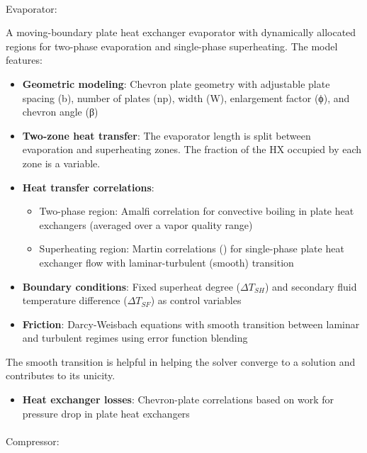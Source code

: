 \documentclass[journal=iecr,manuscript=]{achemso}
\makeatletter
\let\oldparagraph\paragraph
\renewcommand{\paragraph}{
    \@ifstar
      \xxxParagraphStar
      \xxxParagraphNoStar
  }
\newcommand{\xxxParagraphStar}[1]{\oldparagraph*{#1}\mbox{}}
\newcommand{\xxxParagraphNoStar}[1]{\oldparagraph{#1}\mbox{}}
\providecommand{\tightlist}{%
  \setlength{\itemsep}{0pt}\setlength{\parskip}{0pt}}
\makeatother
\begin{document}
\paragraph{Evaporator:}\label{evaporator}

A moving-boundary plate heat exchanger evaporator with dynamically
allocated regions for two-phase evaporation and single-phase
superheating. The model features:

\begin{itemize}
\item
  \textbf{Geometric modeling}: Chevron plate geometry with adjustable
  plate spacing (b), number of plates (np), width (W), enlargement
  factor (ϕ), and chevron angle (β)
\item
  \textbf{Two-zone heat transfer}: The evaporator length is split
  between evaporation and superheating zones. The fraction of the HX
  occupied by each zone is a variable.
\item
  \textbf{Heat transfer correlations}:

  \begin{itemize}
  \item
    Two-phase region: Amalfi correlation for convective boiling in plate
    heat exchangers (averaged over a vapor quality range)
  \item
    Superheating region: Martin correlations (\citet{vdi_e_v_n6_2010})
    for single-phase plate heat exchanger flow with laminar-turbulent
    (smooth) transition
  \end{itemize}
\item
  \textbf{Boundary conditions}: Fixed superheat degree
  (\(\Delta T_{SH}\)) and secondary fluid temperature difference
  (\(\Delta T_{SF}\)) as control variables
\item
  \textbf{Friction}: Darcy-Weisbach equations with smooth transition
  between laminar and turbulent regimes using error function blending
\end{itemize}

The smooth transition is helpful in helping the solver converge to a
solution and contributes to its unicity.

\begin{itemize}
\tightlist
\item
  \textbf{Heat exchanger losses}: Chevron-plate correlations based on
  \citet{vdi_e_v_n6_2010} work for pressure drop in plate heat
  exchangers
\end{itemize}

\paragraph{Compressor:}\label{compressor}
\end{document}
